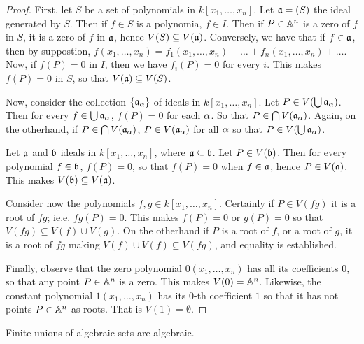 \begin{proof}
    First, let $S$ be a set of polynomials in  $k[x_1, \dots, x_n]$. Let
    $\af=(S)$ the ideal generated by $S$. Then if  $f \in S$ is a polynomia,  $f
    \in I$. Then if $P \in \A^n$ is a zero of $f$ in $S$, it is a zero of $f$ in
     $\af$, hence  $V(S) \subseteq V(\af)$. Conversely, we have that if $f \in
     \af$, then by suppostion, $f(x_1, \dots, x_n)=f_1(x_1, \dots,
     x_n)+\dots+f_n(x_1, \dots, x_n)+\dots$. Now, if $f(P)=0$ in $I$, then we
     have $f_i(P)=0$ for every $i$. This makes $f(P)=0$ in $S$, so that  $V(\af)
     \subseteq V(S)$.

     Now, consider the collection $\{\af_\a\}$ of ideals in $k[x_1, \dots,
     x_n]$. Let $P \in V(\bigcup{\af_\a})$. Then for every $f \in
     \bigcup{\af_\a}$, $f(P)=0$ for each $\a$. So that $P \in
     \bigcap{V(\af_\a)}$. Again, on the otherhand, if $P \in
     \bigcap{V(\af_\a)}$, $P \in V(\af_\a)$ for all $\a$ so that  $P \in
     V(\bigcup{\af_\a})$.

     Let $\af$ and  $\bf$ ideals in  $k[x_1, \dots, x_n]$, where $\af \subseteq
     \bf$. Let $P \in V(\bf)$. Then for every polynomial $f \in \bf$, $f(P)=0$,
     so that $f(P)=0$ when $f \in \af$, hence  $P \in V(\af)$. This makes
     $V(\bf) \subseteq V(\af)$.

     Consider now the polynomials $f,g \in k[x_1, \dots, x_n]$. Certainly if $P
     \in V(fg)$ it is a root of $fg$; ie.e.  $fg(P)=0$. This makes $f(P)=0$ or
     $g(P)=0$ so that $V(fg) \subseteq V(f) \cup V(g)$. On the otherhand if $P$
     is a root of $f$, or a root of $g$, it is a root of  $fg$ making  $V(f)
     \cup V(f) \subseteq V(fg)$, and equality is established.

     Finally, observe that the zero polynomial $0(x_1, \dots, x_n)$ has all its
     coefficients $0$, so that any point $P \in \A^n$ is a zero. This makes
     $V(0)=\A^n$. Likewise, the constant polynomial $1(x_1, \dots, x_n)$ has its
     $0$-th coefficient $1$ so that it has not points  $P \in \A^n$ as roots.
     That is  $V(1)=\emptyset$.
\end{proof}
\begin{corollary}
    Finite unions of algebraic sets are algebraic.
\end{corollary}


